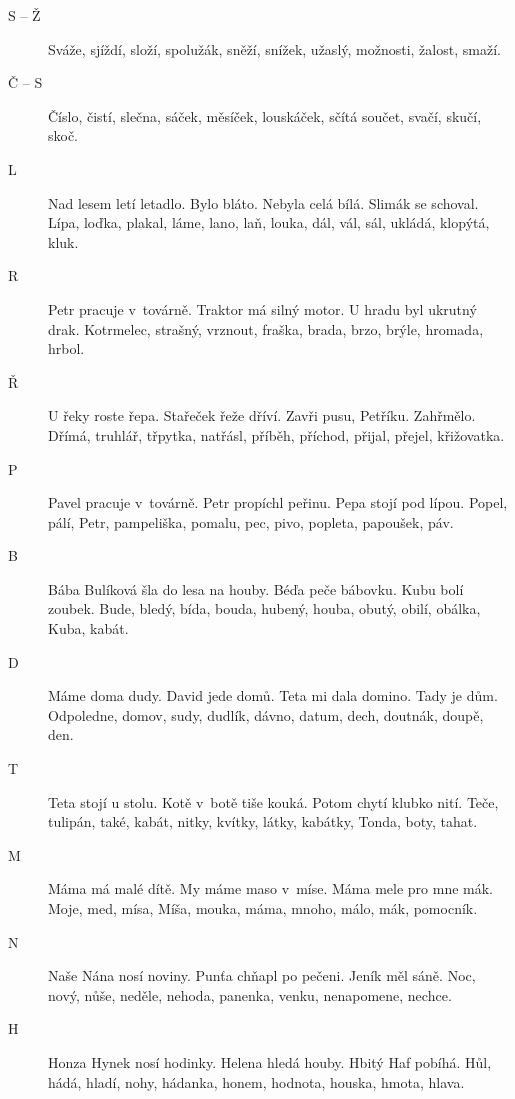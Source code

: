 \begin{multicols}{\value{columnsgames}}
\begin{description}
\item[S -- Ž] Sváže, sjíždí, složí, spolužák, sněží, snížek, užaslý,
možnosti, žalost, smaží.

\item[Č -- S] Číslo, čistí, slečna, sáček, měsíček, louskáček, sčítá součet, 
svačí, skučí, skoč.

\item[L] Nad lesem letí letadlo. Bylo bláto. Nebyla celá bílá. Slimák 
se schoval. Lípa, loďka, plakal, láme, lano, laň, louka, dál, vál, sál,
ukládá, klopýtá, kluk.

\item[R] Petr pracuje v~továrně. Traktor má silný motor. U hradu 
byl ukrutný drak. Kotrmelec, strašný, vrznout, fraška, brada, brzo, brýle, hromada, hrbol.

\item[Ř] U řeky roste řepa. Stařeček řeže dříví. Zavři pusu, Petříku. Zahřmělo.
Dřímá, truhlář, třpytka, natřásl, příběh, příchod, přijal, přejel, křižovatka.

\item[P] Pavel pracuje v~továrně. Petr propíchl peřinu. Pepa stojí 
pod lípou. Popel, pálí, Petr, pampeliška, pomalu, pec, pivo, popleta,
papoušek, páv.

\item[B] Bába Bulíková šla do lesa na houby. Béďa peče bábovku. Kubu 
bolí zoubek. Bude, bledý, bída, bouda, hubený, houba, obutý, obilí, obálka, 
Kuba, kabát.

\item[D] Máme doma dudy. David jede domů. Teta mi dala domino. Tady je 
dům. Odpoledne, domov, sudy, dudlík, dávno, datum, dech, doutnák, 
doupě, den.

\item[T] Teta stojí u stolu. Kotě v~botě tiše kouká. Potom chytí 
klubko nití. Teče, tulipán, také, kabát, nitky, kvítky, látky, kabátky,
Tonda, boty, tahat.

\item[M] Máma má malé dítě. My máme maso v~míse. Máma mele pro 
mne mák. Moje, med, mísa, Míša, mouka, máma, mnoho, málo, mák, pomocník.

\item[N] Naše Nána nosí noviny. Punťa chňapl po pečeni. Jeník měl sáně.
Noc, nový, nůše, neděle, nehoda, panenka, venku, nenapomene, nechce.

\item[H] Honza Hynek nosí hodinky. Helena hledá houby. Hbitý Haf pobíhá.
Hůl, hádá, hladí, nohy, hádanka, honem, hodnota, houska, hmota, hlava.


\end{description}
\end{multicols}
